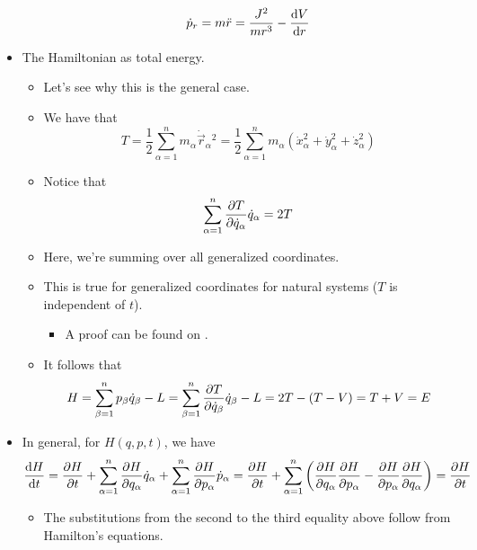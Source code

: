 \documentclass[../notes.tex]{subfiles}
\begin{document}
\begin{itemize}
\begin{itemize}
\begin{equation*}
            \dot{p}_r = m\ddot{r} = \frac{J^2}{mr^3}-\dv{V}{r}
        \end{equation*}
    \end{itemize}
    \item The Hamiltonian as total energy.
    \begin{itemize}
        \item Let's see why this is the general case.
        \item We have that
        \begin{equation*}
            T = \frac{1}{2}\sum_{\alpha=1}^nm_\alpha\dot{\vec{r}}_\alpha{}^2
            = \frac{1}{2}\sum_{\alpha=1}^nm_\alpha(\dot{x}_\alpha^2+\dot{y}_\alpha^2+\dot{z}_\alpha^2)
        \end{equation*}
        \item Notice that
        \begin{equation*}
            \sum_{\alpha=1}^n\pdv{T}{\dot{q}_\alpha}\dot{q}_\alpha = 2T
        \end{equation*}
        \item Here, we're summing over all generalized coordinates.
        \item This is true for generalized coordinates for natural systems ($T$ is independent of $t$).
        \begin{itemize}
            \item A proof can be found on \textcite[232-33]{bib:KibbleBerkshire}.
        \end{itemize}
        \item It follows that
        \begin{equation*}
            H = \sum_{\beta=1}^np_\beta\dot{q}_\beta-L
            = \sum_{\beta=1}^n\pdv{T}{\dot{q}_\beta}\dot{q}_\beta-L
            = 2T-(T-V)
            = T+V
            = E
        \end{equation*}
    \end{itemize}
    \item In general, for $H(q,p,t)$, we have
    \begin{equation*}
        \dv{H}{t} = \pdv{H}{t}+\sum_{\alpha=1}^n\pdv{H}{q_\alpha}\dot{q}_\alpha+\sum_{\alpha=1}^n\pdv{H}{p_\alpha}\dot{p}_\alpha
        = \pdv{H}{t}+\sum_{\alpha=1}^n\left( \pdv{H}{q_\alpha}\pdv{H}{p_\alpha}-\pdv{H}{p_\alpha}\pdv{H}{q_\alpha} \right)
        = \pdv{H}{t}
    \end{equation*}
    \begin{itemize}
        \item The substitutions from the second to the third equality above follow from Hamilton's equations.

\end{itemize}
\end{itemize}
\end{document}
